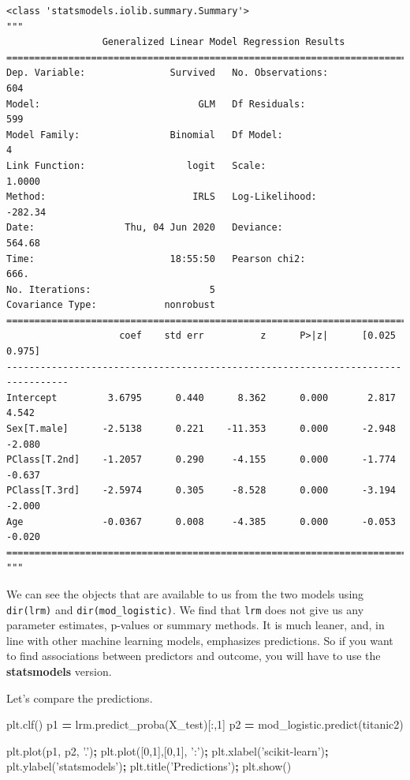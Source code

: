 \documentclass[
  letterpaper,
]{scrbook}
\newenvironment{Shaded}{\begin{snugshade}}{\end{snugshade}}
\newcommand{\DecValTok}[1]{\textcolor[rgb]{0.00,0.00,0.81}{#1}}
\newcommand{\NormalTok}[1]{#1}
\newcommand{\OperatorTok}[1]{\textcolor[rgb]{0.81,0.36,0.00}{\textbf{#1}}}
\newcommand{\StringTok}[1]{\textcolor[rgb]{0.31,0.60,0.02}{#1}}
\begin{document}
\begin{verbatim}
<class 'statsmodels.iolib.summary.Summary'>
"""
                 Generalized Linear Model Regression Results                  
==============================================================================
Dep. Variable:               Survived   No. Observations:                  604
Model:                            GLM   Df Residuals:                      599
Model Family:                Binomial   Df Model:                            4
Link Function:                  logit   Scale:                          1.0000
Method:                          IRLS   Log-Likelihood:                -282.34
Date:                Thu, 04 Jun 2020   Deviance:                       564.68
Time:                        18:55:50   Pearson chi2:                     666.
No. Iterations:                     5                                         
Covariance Type:            nonrobust                                         
=================================================================================
                    coef    std err          z      P>|z|      [0.025      0.975]
---------------------------------------------------------------------------------
Intercept         3.6795      0.440      8.362      0.000       2.817       4.542
Sex[T.male]      -2.5138      0.221    -11.353      0.000      -2.948      -2.080
PClass[T.2nd]    -1.2057      0.290     -4.155      0.000      -1.774      -0.637
PClass[T.3rd]    -2.5974      0.305     -8.528      0.000      -3.194      -2.000
Age              -0.0367      0.008     -4.385      0.000      -0.053      -0.020
=================================================================================
"""
\end{verbatim}

We can see the objects that are available to us from the two models using
\texttt{dir(lrm)} and \texttt{dir(mod\_logistic)}. We find that \texttt{lrm} does not give us
any parameter estimates, p-values or summary methods. It is much leaner, and, in line with other machine learning models, emphasizes predictions. So if you want to find associations between predictors and outcome, you will have to use the \textbf{statsmodels} version.

Let's compare the predictions.

\begin{Shaded}
\begin{Highlighting}[]
\NormalTok{plt.clf()}
\NormalTok{p1 }\OperatorTok{=}\NormalTok{ lrm.predict_proba(X_test)[:,}\DecValTok{1}\NormalTok{]}
\NormalTok{p2 }\OperatorTok{=}\NormalTok{ mod_logistic.predict(titanic2)}

\NormalTok{plt.plot(p1, p2, }\StringTok{'.'}\NormalTok{)}\OperatorTok{;}
\NormalTok{plt.plot([}\DecValTok{0}\NormalTok{,}\DecValTok{1}\NormalTok{],[}\DecValTok{0}\NormalTok{,}\DecValTok{1}\NormalTok{], }\StringTok{':'}\NormalTok{)}\OperatorTok{;}
\NormalTok{plt.xlabel(}\StringTok{'scikit-learn'}\NormalTok{)}\OperatorTok{;}
\NormalTok{plt.ylabel(}\StringTok{'statsmodels'}\NormalTok{)}\OperatorTok{;}
\NormalTok{plt.title(}\StringTok{'Predictions'}\NormalTok{)}\OperatorTok{;}
\NormalTok{plt.show()}
\end{Highlighting}
\end{Shaded}
\end{document}
